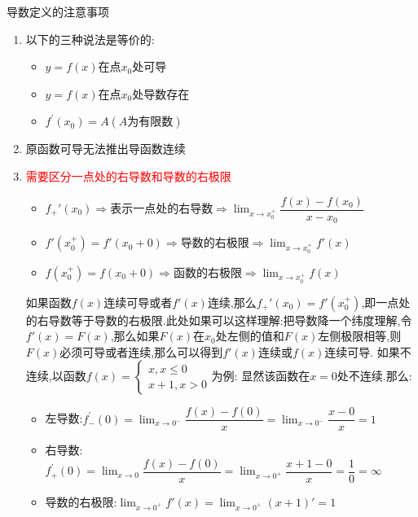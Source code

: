 \documentclass[8pt a4paper, oneside, UTF8]{ctexbook}  %
\begin{document}
\begin{sloppypar}
\begin{criterion}{导数定义的注意事项}{}
\begin{enumerate}
\begin{itemize}
            \item 分子为一个动点一个定点
        \end{itemize}
        \item 以下的三种说法是等价的:
            \begin{itemize}
                \item  $y=f\left(x\right)$在点$x_{0}$处可导
                \item $y=f\left(x\right)$在点$x_{0}$处导数存在
                \item  $f^{\prime}\left(x_{0}\right)=A\left(A\text{为有限数}\right)$
            \end{itemize}
        \item 原函数可导无法推出导函数连续
        \item \textcolor{red}{需要区分一点处的右导数和导数的右极限}
            \begin{itemize}
                \item $f_+'(x_0) \Rightarrow$表示一点处的右导数$\Rightarrow \lim_{x \to x_0^+}\dfrac{f(x)-f(x_0)}{x-x_0}$
                \item $f'(x_0 ^+)=f'(x_0+0) \Rightarrow$导数的右极限$\Rightarrow \lim_{x\to x_0^+}f'(x)$
                \item $f(x_{0}^{+})=f(x_{0}+0) \Rightarrow$函数的右极限$\Rightarrow \lim_{x\to x ^+ _0}f(x)$
            \end{itemize}
        如果函数$f(x)$连续可导或者$f'(x)$连续,那么$f_+'(x_0)=f'(x_0^+)$,即一点处的右导数等于导数的右极限.此处如果可以这样理解:把导数降一个纬度理解,令$f'(x)=F(x)$,那么如果$F(x)$在$x_0$处左侧的值和$F(x)$左侧极限相等,则$F(x)$必须可导或者连续,那么可以得到$f'(x)$连续或$f(x)$连续可导.
        如果不连续,以函数$f(x)=\begin{cases}
            x,x \leqslant 0\\
            x+1,x >0
        \end{cases}$为例:
        显然该函数在$x=0$处不连续.那么:
        \begin{itemize}
            \item 左导数:$f_-^{\prime}(0)=\lim_{x\to0^{-}}\dfrac{f(x)-f(0)}{x}=\lim_{x\to0^{-}}\dfrac{x-0}{x}=1$
            \item 右导数:$f_{+}^{\prime}(0)=\lim_{x\to0}\dfrac{f(x)-f(0)}{x}=\lim_{x\to0^{+}}\dfrac{x+1-0}{x}=\dfrac{1}{0}=\infty $
            \item 导数的右极限:$\lim_{x \to 0^+}f'(x)=\lim_{x\to 0^+}(x+1)' = 1$
        \end{itemize}
        \end{enumerate}

\end{criterion}
\end{sloppypar}
\end{document}
